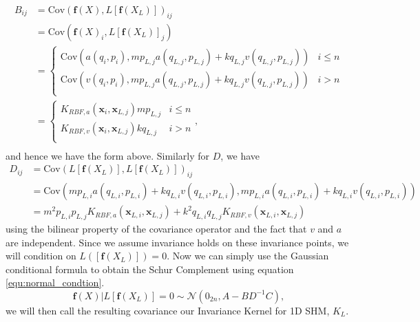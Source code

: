 \documentclass{statsmsc}
\begin{document}
\begin{align*}
B_{ij} &= \mathrm{Cov}(\mathbf{f}(X), L[\mathbf{f}(X_L)])_{ij} \\
       &= \mathrm{Cov}(\mathbf{f}(X)_i, L[\mathbf{f}(X_L)]_j) \\ 
       &= \begin{cases}
        \mathrm{Cov}(a(q_i, p_i), mp_{L,j}a(q_{L,j},p_{L,j}) + kq_{L,j}v(q_{L,j},p_{L,j})) & i\le n \\ 
        \mathrm{Cov}(v(q_i, p_i), mp_{L,j}a(q_{L,j},p_{L,j}) + kq_{L,j}v(q_{L,j},p_{L,j})) & i>n \\ 
       \end{cases} \\
       &= \begin{cases}
        K_{RBF,a}(\mathbf{x}_i, \mathbf{x}_{L,j}) mp_{L,j} & i\le n \\ 
        K_{RBF,v}(\mathbf{x}_i, \mathbf{x}_{L,j}) kq_{L,j} & i>n \\ 
       \end{cases}, \\
\end{align*}
and hence we have the form above. 
Similarly for $D$, we have
\begin{align*}
D_{ij} &= \mathrm{Cov}(L[\mathbf{f}(X_L)], L[\mathbf{f}(X_L)])_{ij} \\
       &= \mathrm{Cov}(mp_{L,i}a(q_{L,i},p_{L,i}) + kq_{L,i}v(q_{L,i},p_{L,i}), mp_{L,i}a(q_{L,i},p_{L,i}) + kq_{L,i}v(q_{L,i},p_{L,i})) \\
       &= m^2p_{L,i}p_{L,j}K_{RBF,a}(\mathbf{x}_{L,i},\mathbf{x}_{L,j}) + k^2q_{L,i}q_{L,j}K_{RBF,v}(\mathbf{x}_{L,i},\mathbf{x}_{L,j})
\end{align*}
using the bilinear property of the covariance operator and the fact that $v$ and $a$ are independent.
Since we assume invariance holds on these invariance points, we will condition on $L([\mathbf{f}(X_L)])=0.$
Now we can simply use the Gaussian conditional formula to obtain the Schur Complement using equation \ref{equ:normal_condtion}.
$$
\mathbf{f}(X)|L[\mathbf{f}(X_L)]=0\sim\mathcal{N}(0_{2n},A-BD^{-1}C),
$$
we will then call the resulting covariance our Invariance Kernel for 1D SHM, $K_L$.
\end{document}
